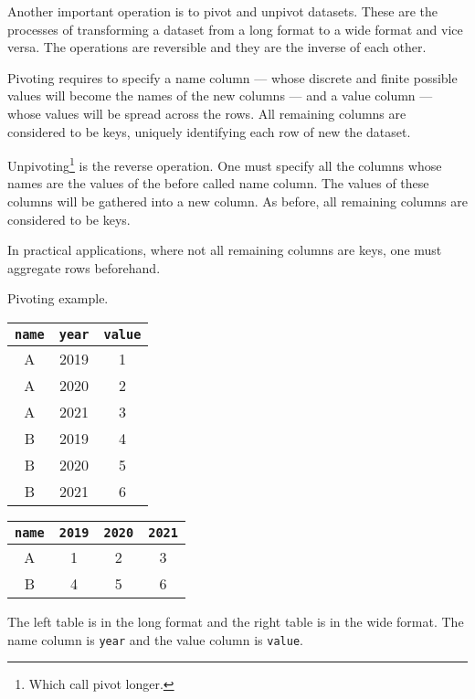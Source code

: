 Another important operation is to pivot and unpivot datasets.  These are the processes of
transforming a dataset from a long format to a wide format and vice versa.  The operations
are reversible and they are the inverse of each other.

Pivoting requires to specify a name column --- whose discrete and finite possible values
will become the names of the new columns --- and a value column --- whose values will be
spread across the rows.  All remaining columns are considered to be keys, uniquely
identifying each row of new the dataset.

Unpivoting\footnote{Which \citeauthor{Wickham2023} call pivot longer.} is the reverse
operation.  One must specify all the columns whose names are the values of the before
called name column.  The values of these columns will be gathered into a new column.
As before, all remaining columns are considered to be keys.

In practical applications, where not all remaining columns are keys, one must aggregate
rows beforehand.

\begin{tablebox}[label=tab:pivot]{Pivoting example.}
  \begin{minipage}{0.45\textwidth}
    \centering
    \begin{tabular}{ccc}
      \toprule
      \texttt{name} & \texttt{year} & \texttt{value} \\
      \midrule
      A & 2019 & 1 \\
      A & 2020 & 2 \\
      A & 2021 & 3 \\
      B & 2019 & 4 \\
      B & 2020 & 5 \\
      B & 2021 & 6 \\
      \bottomrule
    \end{tabular}
  \end{minipage}
  \hfill
  \begin{minipage}{0.45\textwidth}
    \centering
    \begin{tabular}{cccc}
      \toprule
      \texttt{name} & \texttt{2019} & \texttt{2020} & \texttt{2021} \\
      \midrule
      A & 1 & 2 & 3 \\
      B & 4 & 5 & 6 \\
      \bottomrule
    \end{tabular}
  \end{minipage}
  \tcblower
  The left table is in the long format and the right table is in the wide format.  The
  name column is \texttt{year} and the value column is \texttt{value}.
\end{tablebox}

